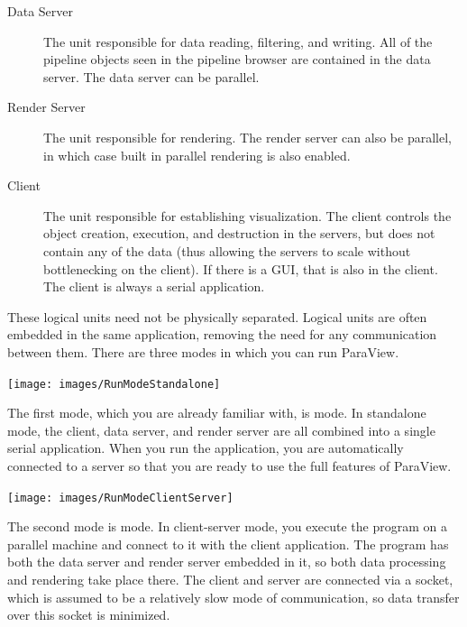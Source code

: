 \begin{description}
\item[Data Server]  The unit responsible for data
  reading, filtering, and writing.  All of the pipeline objects seen in the
  pipeline browser are contained in the data server.  The data server can
  be parallel.
\item[Render Server] The unit responsible for
  rendering.  The render server can also be parallel, in which case built
  in parallel rendering is also enabled.
\item[Client] The unit responsible for establishing
  visualization.  The client controls the object creation, execution, and
  destruction in the servers, but does not contain any of the data (thus
  allowing the servers to scale without bottlenecking on the client).  If
  there is a GUI, that is also in the client.  The client is always a
  serial application.
\end{description}

These logical units need not be physically separated.  Logical units are
often embedded in the same application, removing the need for any
communication between them.  There are three modes in which you can run
ParaView.

\begin{inlinefig}
  \texttt{[image: images/RunModeStandalone]}
\end{inlinefig}

The first mode, which you are already familiar with, is
 mode.  In standalone mode, the client, data server,
and render server are all combined into a single serial application.  When
you run the  application, you are automatically connected
to a  server so that you are ready to use the full
features of ParaView.

\begin{inlinefig}
  \texttt{[image: images/RunModeClientServer]}
\end{inlinefig}

The second mode is  mode.  In client-server mode,
you execute the  program on a parallel machine and
connect to it with the  client application.  The
 program has both the data server and render server
embedded in it, so both data processing and rendering take place there.
The client and server are connected via a socket, which is assumed to be a
relatively slow mode of communication, so data transfer over this socket is
minimized.

